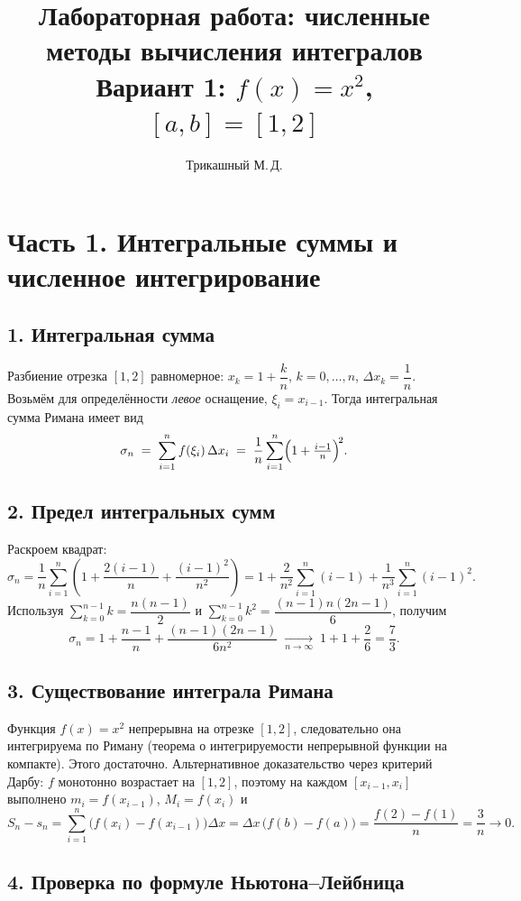 \documentclass[12pt,a4paper]{article}
\title{Лабораторная работа: численные методы вычисления интегралов\\[4pt]
\large Вариант 1: $f(x)=x^2$, $[a,b]=[1,2]$}
\author{Трикашный М.\,Д.}
\date{}
\begin{document}
\maketitle

\section*{Часть 1. Интегральные суммы и численное интегрирование}

\subsection*{1. Интегральная сумма}

Разбиение отрезка $[1,2]$ равномерное: $x_k = 1 + \dfrac{k}{n}$, $k=0,\dots,n$,
$\Delta x_k = \dfrac{1}{n}$. Возьмём для определённости \emph{левое}
оснащение, $\xi_i = x_{i-1}$. Тогда интегральная сумма Римана имеет вид
\[
  \sigma_n \;=\; \sum_{i=1}^{n} f(\xi_i)\,\Delta x_i
  \;=\; \frac{1}{n}\sum_{i=1}^{n}\Bigl(1+\tfrac{i-1}{n}\Bigr)^{\!2}.
\]

\subsection*{2. Предел интегральных сумм}

Раскроем квадрат:
\[
  \sigma_n
  = \frac{1}{n}\sum_{i=1}^{n}\!\left(1+\frac{2(i-1)}{n}+\frac{(i-1)^2}{n^2}\right)
  = 1 + \frac{2}{n^2}\sum_{i=1}^{n}(i-1) + \frac{1}{n^3}\sum_{i=1}^{n}(i-1)^2.
\]
Используя $\sum_{k=0}^{n-1}k=\dfrac{n(n-1)}{2}$ и
$\sum_{k=0}^{n-1}k^2=\dfrac{(n-1)n(2n-1)}{6}$, получим
\[
  \sigma_n = 1 + \frac{n-1}{n} + \frac{(n-1)(2n-1)}{6n^2}
  \;\xrightarrow[n\to\infty]{}\; 1+1+\frac{2}{6} = \frac{7}{3}.
\]

\subsection*{3. Существование интеграла Римана}

Функция $f(x)=x^2$ непрерывна на отрезке $[1,2]$, следовательно она
интегрируема по Риману (теорема о интегрируемости непрерывной функции на
компакте). Этого достаточно. Альтернативное доказательство через
критерий Дарбу: $f$ монотонно возрастает на $[1,2]$, поэтому на каждом
$[x_{i-1},x_i]$ выполнено $m_i=f(x_{i-1})$, $M_i=f(x_i)$ и
\[
  S_n - s_n
  = \sum_{i=1}^{n}\bigl(f(x_i)-f(x_{i-1})\bigr)\Delta x
  = \Delta x\,\bigl(f(b)-f(a)\bigr) = \frac{f(2)-f(1)}{n} = \frac{3}{n}\to 0.
\]

\subsection*{4. Проверка по формуле Ньютона--Лейбница}
\end{document}
